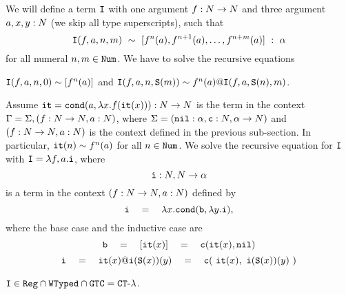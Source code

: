 \begin{Eg}
We will define a term ${\tt I}$ with one argument $f:{N} \rightarrow {N}$ and three argument
$a,x,y:{N}$ (we skip all type superscripts), such that 
\[
{\tt I}(f,a,n,m) \  \sim \ [f^n(a), f^{n+1}(a), \ldots, f^{n+m}(a)] \  : \ \alpha
\]
for all numeral $n,m \in {\tt Num}$. 
We have to solve the recursive equations 
\begin{center}
  ${\tt I}(f,a,n,0) \sim [f^n(a)]$
  \quad
  and
  \quad
  ${\tt I}(f,a,n,{\tt S} (m))  \sim f^n(a) @ {\tt I}(f,a,{\tt S}(n),m)$.
\end{center}
Assume ${\tt it} = {\tt cond} (a, \lambda x.f({\tt it}(x))):{N} \rightarrow {N}$ is the term
in the context $\Gamma = \Sigma,(f:{N} \rightarrow {N}, a:{N})$, where
$\Sigma = ({\tt nil}:\alpha, {\tt c}:{N},\alpha \rightarrow {N})$
and
$(f:{N}\rightarrow{N}, a:{N})$ is the context defined 
in the previous sub-section. In particular, ${\tt it}(n) \sim f^n(a)$ for all $n \in {\tt Num}$.
We solve the recursive equation for ${\tt I}$ with ${\tt I} = \lambda f,a.{\tt i}$,
where 
\[
{\tt i}:{N},{N} \rightarrow \alpha
\]
is a term in the context $(f:{N}\rightarrow{N}, a:{N})$ defined by 
\[
\interval 
\ \ \ = \ \ \ 
\lambda x.\cond (\base,  \lambda y.\inductive),
\]
where the base case and the inductive case are
\[
\base 
\ \ \ =\ \ \  
[\iter(x)]
\ \ \ =\ \ \ 
\cons(\iter(x),\nil)
\]
\[
\inductive 
\ \ \ = \ \ \ 
\iter(x) @ \interval(\Succ(x))(y)
\ \ \ = \ \ \  
\cons(\ \iter(x), \ \interval(\Succ(x))(y) \ )
\]
\end{Eg}

\begin{proposition}
${\tt I} \in {\tt Reg} \cap {\tt WTyped} \cap {\tt GTC} = { {\tt CT}\mbox{-}\lambda}$.
\end{proposition}


